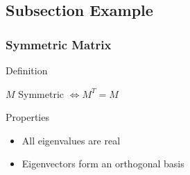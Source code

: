 \documentclass[8pt]{beamer}
\begin{document}


\subsection{Subsection Example} %

\begin{frame}
\frametitle{Symmetric Matrix}

\begin{block}{Definition}

$M$ Symmetric $\iff M^T = M$
\end{block}

\begin{block}{Properties}
\begin{itemize}
    \item All eigenvalues are real
    \item Eigenvectors form an orthogonal basis
\end{itemize}
\end{block}

\end{frame}

\end{document}
